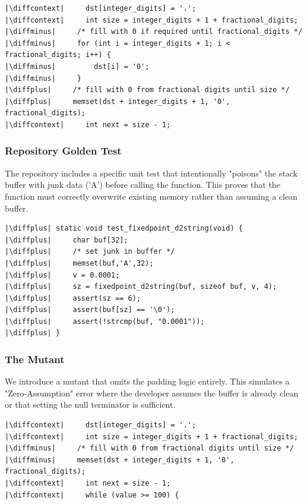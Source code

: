 \documentclass[11pt]{article}
\newcommand{\diffminus}{\textcolor{red}{-}}         %
\newcommand{\diffplus}{\textcolor{green!70!black}{+}} %
\newcommand{\diffcontext}{\phantom{+}}              %
\begin{document}
\begin{verbatim}
|\diffcontext|     dst[integer_digits] = '.';
|\diffcontext|     int size = integer_digits + 1 + fractional_digits;
|\diffminus|     /* fill with 0 if required until fractional_digits */
|\diffminus|     for (int i = integer_digits + 1; i < fractional_digits; i++) {
|\diffminus|         dst[i] = '0';
|\diffminus|     }
|\diffplus|     /* fill with 0 from fractional digits until size */
|\diffplus|     memset(dst + integer_digits + 1, '0', fractional_digits);
|\diffcontext|     int next = size - 1;
\end{verbatim}

\subsubsection{Repository Golden Test}
The repository includes a specific unit test that intentionally "poisons" the stack buffer with junk data ('A') before calling the function. This proves that the function must correctly overwrite existing memory rather than assuming a clean buffer.

\begin{verbatim}
|\diffplus| static void test_fixedpoint_d2string(void) {
|\diffplus|     char buf[32];
|\diffplus|     /* set junk in buffer */
|\diffplus|     memset(buf,'A',32);
|\diffplus|     v = 0.0001;
|\diffplus|     sz = fixedpoint_d2string(buf, sizeof buf, v, 4);
|\diffplus|     assert(sz == 6);
|\diffplus|     assert(buf[sz] == '\0');
|\diffplus|     assert(!strcmp(buf, "0.0001"));
|\diffplus| }
\end{verbatim}

\subsubsection{The Mutant}
We introduce a mutant that omits the padding logic entirely. This simulates a "Zero-Assumption" error where the developer assumes the buffer is already clean or that setting the null terminator is sufficient.

\begin{verbatim}
|\diffcontext|     dst[integer_digits] = '.';
|\diffcontext|     int size = integer_digits + 1 + fractional_digits;
|\diffminus|     /* fill with 0 from fractional digits until size */
|\diffminus|     memset(dst + integer_digits + 1, '0', fractional_digits);
|\diffcontext|     int next = size - 1;
|\diffcontext|     while (value >= 100) {
\end{verbatim}
\end{document}
